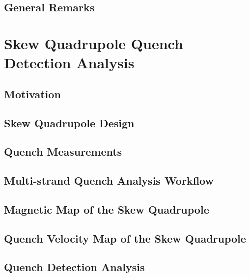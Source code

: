 \documentclass[11pt,a4paper]{report}
\begin{document}
\section{General Remarks}


\clearpage
\chapter{Skew Quadrupole Quench Detection Analysis}
\label{chapter:skew_quadrupole_quench_detection_analysis}

\section{Motivation}


\section{Skew Quadrupole Design}


\section{Quench Measurements}


\section{Multi-strand Quench Analysis Workflow}


\section{Magnetic Map of the Skew Quadrupole}


\section{Quench Velocity Map of the Skew Quadrupole}


\section{Quench Detection Analysis}
% 
\end{document}
